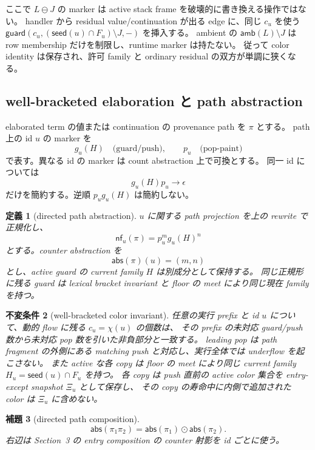 \documentclass[uplatex,dvipdfmx,a4paper,10.5pt]{jsarticle}
\theoremstyle{jpplain}
\newtheorem{definition}{定義}[section]
\newtheorem{lemma}[definition]{補題}
\newtheorem{invariant}[definition]{不変条件}
\newcommand{\guard}{\mathsf{guard}}
\newcommand{\abs}{\mathsf{abs}}
\newcommand{\nf}{\mathsf{nf}}
\newcommand{\amb}{\mathsf{amb}}
\newcommand{\seedcap}{\mathsf{seed}}
\begin{document}
ここで $L\ominus J$ の marker は active stack frame を破壊的に書き換える操作ではない。
handler から residual value/continuation が出る edge に、同じ $c_u$ を使う
$\guard(c_u,(\seedcap(u)\cap F_u)\setminus J,-)$ を挿入する。
ambient の $\amb(L)\setminus J$ は row membership だけを制限し、runtime marker は持たない。
従って color identity は保存され、許可 family と ordinary residual の双方が単調に狭くなる。

\subsection{well-bracketed elaboration と path abstraction}

elaborated term の値または continuation の provenance path を $\pi$ とする。
path 上の id $u$ の marker を
\[
  g_u(H)\quad\text{(guard/push)},
  \qquad
  p_u\quad\text{(pop-paint)}
\]
で表す。異なる id の marker は count abstraction 上で可換とする。
同一 id については
\[
  g_u(H)p_u\longrightarrow\epsilon
\]
だけを簡約する。逆順 $p_ug_u(H)$ は簡約しない。

\begin{definition}[directed path abstraction]
$u$ に関する path projection を上の rewrite で正規化し、
\[
  \nf_u(\pi)=p_u^m g_u(H)^n
\]
とする。counter abstraction を
\[
  \abs(\pi)(u)=(m,n)
\]
とし、active guard の current family $H$ は別成分として保持する。
同じ正規形に残る guard は lexical bracket invariant と floor の meet により同じ現在 familyを持つ。
\end{definition}

\begin{invariant}[well-bracketed color invariant]\label{inv:color-bracket}
任意の実行 prefix と id $u$ について、動的 flow に残る $c_u=\chi(u)$ の個数は、
その prefix の未対応 guard/push 数から未対応 pop 数を引いた非負部分と一致する。
leading pop は path fragment の外側にある matching push と対応し、実行全体では underflow を起こさない。
また active な各 copy は floor の meet により同じ current family $H_u=\seedcap(u)\cap F_u$ を持つ。
各 copy は push 直前の active color 集合を entry-except snapshot $\Xi_u$ として保存し、
その copy の寿命中に内側で追加された color は $\Xi_u$ に含めない。
\end{invariant}

\begin{lemma}[directed path composition]\label{lem:path-compose}
\[
  \abs(\pi_1\pi_2)=\abs(\pi_1)\odot\abs(\pi_2).
\]
右辺は Section~3 の entry composition の counter 射影を id ごとに使う。
\end{lemma}
\end{document}
